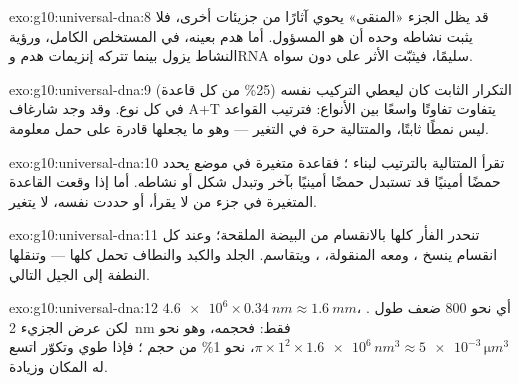 \begin{solution}{exo:g10:universal-dna:8}
قد يظل الجزء «المنقى» يحوي آثارًا من جزيئات أخرى، فلا يثبت نشاطه وحده
أن  هو المسؤول. أما هدم  بعينه، في المستخلص الكامل، ورؤية النشاط
يزول بينما تتركه إنزيمات هدم  وRNA سليمًا، فيثبّت الأثر على 
دون سواه.
\end{solution}

\begin{solution}{exo:g10:universal-dna:9}
التكرار الثابت كان ليعطي التركيب نفسه (25\% من كل قاعدة) في كل نوع.
وقد وجد شارغاف A+T يتفاوت تفاوتًا واسعًا بين الأنواع: فترتيب القواعد
ليس نمطًا ثابتًا، والمتتالية حرة في التغير --- وهو ما يجعلها قادرة على
حمل معلومة.
\end{solution}

\begin{solution}{exo:g10:universal-dna:10}
تقرأ المتتالية بالترتيب لبناء ؛ فقاعدة متغيرة في موضع يحدد
حمضًا أمينيًا قد تستبدل حمضًا أمينيًا بآخر وتبدل شكل  أو
نشاطه. أما إذا وقعت القاعدة المتغيرة في جزء من  لا يقرأ، أو
حددت  نفسه،  لا يتغير.
\end{solution}

\begin{solution}{exo:g10:universal-dna:11}
تنحدر  الفأر كلها بالانقسام من البيضة الملقحة؛ وعند كل انقسام
ينسخ ، ومعه  المنقولة، ، ويتقاسم.  الجلد
والكبد والنطاف تحمل  كلها --- وتنقلها النطفة إلى الجيل التالي.
\end{solution}

\begin{solution}{exo:g10:universal-dna:12}
$\num{4.6e6} \times \qty{0.34}{nm} \approx \qty{1.6}{mm}$، أي نحو 800
ضعف طول . لكن عرض الجزيء \qty{2}{nm} فقط: فحجمه، وهو نحو
$\pi \times 1^2 \times \num{1.6e6}\,
\unit{nm^3} \approx \num{5e-3}\,\unit{\micro m^3}$، نحو 1\% من حجم
؛ فإذا طوي وتكوّر اتسع له المكان وزيادة.
\end{solution}


